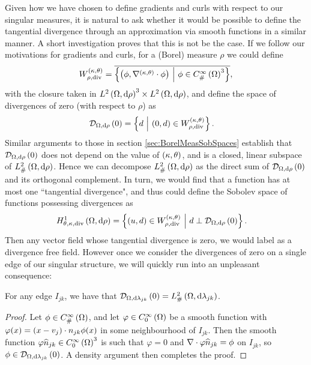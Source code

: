 Given how we have chosen to define gradients and curls with respect to our singular measures, it is natural to ask whether it would be possible to define the tangential divergence through an approximation via smooth functions in a similar manner.
A short investigation proves that this is not be the case.
If we follow our motivations for gradients and curls, for a (Borel) measure $\rho$ we could define
\begin{align*}
	W_{\rho,\mathrm{div}}^{\left( \kappa, \theta \right)} = \overline{\left\{  \left( \phi,\nabla^{\left( \kappa, \theta \right)}\cdot\phi \right) \ \middle\vert \  \phi\in C^{\infty}_{\#}\left( \Omega \right)^3  \right\}},
\end{align*}
with the closure taken in $L^{2}\left( \Omega,\mathrm{d} \rho \right)^3\times L^{2}\left( \Omega,\mathrm{d} \rho \right)$, and define the space of divergences of zero (with respect to $\rho$) as
\begin{align*}
	\mathcal{D}_{\Omega,\mathrm{d}\rho}\left( 0 \right) &= \left\{ d \ \middle\vert \  \left( 0,d \right)\in W_{\rho,\mathrm{div}}^{\left( \kappa, \theta \right)} \right\}.
\end{align*}
Similar arguments to those in section \ref{sec:BorelMeasSobSpaces} establish that $\mathcal{D}_{\Omega,\mathrm{d}\rho}\left( 0 \right)$ does not depend on the value of $\left( \kappa, \theta \right)$, and is a closed, linear subspace of $L^2_{\#}\left( \Omega,\mathrm{d} \rho \right)$.
Hence we can decompose $L^2_{\#}\left( \Omega,\mathrm{d} \rho \right)$ as the direct sum of $\mathcal{D}_{\Omega,\mathrm{d}\rho}\left( 0 \right)$ and its orthogonal complement.
In turn, we would find that a function has at most one ``tangential divergence", and thus could define the Sobolev space of functions possessing divergences as
\begin{align*}
	H^1_{\theta,\kappa,\mathrm{div}}\left( \Omega,\mathrm{d}\rho \right)
	&= \left\{  \left( u,d \right)\in W_{\rho,\mathrm{div}}^{\left( \kappa, \theta \right)} \ \middle\vert \  d\perp\mathcal{D}_{\Omega,\mathrm{d}\rho}\left( 0 \right)  \right\}.
\end{align*}
Then any vector field whose tangential divergence is zero, we would label as a divergence free field.
However once we consider the divergences of zero on a single edge of our singular structure, we will quickly run into an unpleasant consequence:
\begin{lemma} \label{lem:DivZero-Everything}
	For any edge $I_{jk}$, we have that $\mathcal{D}_{\Omega,\mathrm{d}\lambda_{jk}}\left( 0 \right)=L^2_{\#}\left( \Omega,\mathrm{d} \lambda_{jk} \right)$.
\end{lemma}
\begin{proof}
	Let $\phi\in C^{\infty}_{\#}\left( \Omega \right)$, and let $\varphi\in C^{\infty}_{0}\left( \Omega \right)$ be a smooth function with $\varphi(x)=\left( x-v_j \right)\cdot n_{jk}\phi(x)$ in some neighbourhood of $I_{jk}$.
	Then the smooth function $\varphi\widehat{n}_{jk}\in C^{\infty}_{0}\left( \Omega \right)^3$ is such that $\varphi=0$ and $\nabla\cdot\varphi\widehat{n}_{jk}=\phi$ on $I_{jk}$, so $\phi\in\mathcal{D}_{\Omega,\mathrm{d}\lambda_{jk}}\left( 0 \right)$.
	A density argument then completes the proof.
\end{proof}
